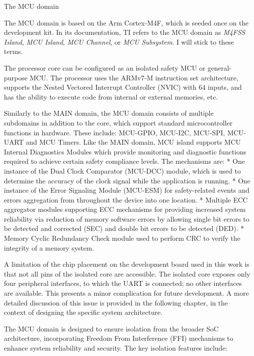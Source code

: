 \secc The MCU domain


The {\sbf MCU domain} is based on the Arm Cortex-M4F, which is seeded once on the development kit. In its documentation, TI refers to the MCU domain as {\it M4FSS Island}, {\it MCU Island}, {\it MCU Channel}, or {\it MCU Subsystem}. I will stick to these terms.

The processor core can be configured as an isolated safety MCU or general-purpose MCU. The processor uses the ARMv7-M instruction set architecture, supports the Nested Vectored Interrupt Controller (NVIC) with 64 inputs, and has the ability to execute code from internal or external memories, etc.

Similarly to the MAIN domain, the MCU domain consists of multiple subdomains in addition to the core, which support standard microcontroller functions in hardware. These include: {\sbf MCU-GPIO}, {\sbf MCU-I2C}, {\sbf MCU-SPI}, {\sbf MCU-UART} and {\sbf MCU Timers}. Like the MAIN domain, MCU island supports {\sbf MCU Internal Diagnostics Modules} which provide monitoring and diagnostic functions required to achieve certain safety compliance levels. The mechanisms are:
\begitems
* One instance of the Dual Clock Comparator (MCU-DCC) module, which is used to determine the accuracy of the clock signal while the application is running.
* One instance of the Error Signaling Module (MCU-ESM) for safety-related events and errors aggregation from throughout the device into one location.
* Multiple ECC aggregator modules supporting ECC mechanisms for providing increased system reliability via reduction of memory software errors by allowing single bit errors to be detected and corrected (SEC) and double bit errors to be detected (DED).
* Memory Cyclic Redundancy Check module used to perform CRC to verify the integrity of a memory system.
\enditems

A limitation of the chip placement on the development board used in this work is that not all pins of the isolated core are accessible. The isolated core exposes only four peripheral interfaces, to which the UART is connected; no other interfaces are available. This presents a minor complication for future development. A more detailed discussion of this issue is provided in the following chapter, in the context of designing the specific system architecture.

The MCU domain is designed to ensure {\sbf isolation from the broader SoC architecture}, incorporating Freedom From Interference (FFI) mechanisms to enhance system reliability and security. The key isolation features include:

